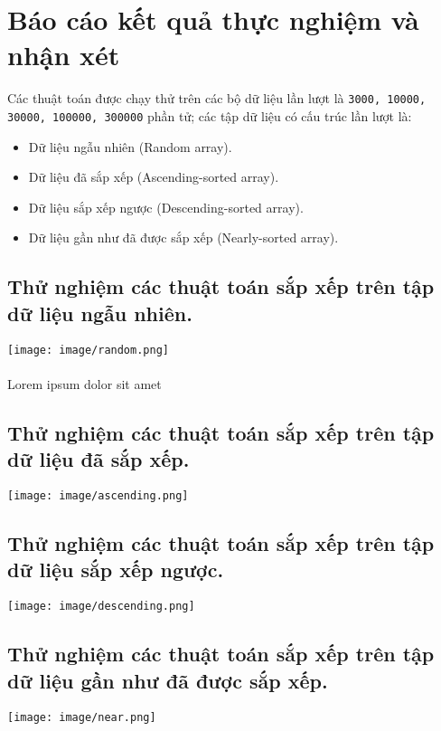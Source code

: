 \documentclass[]{article}
\begin{document}
\section{Báo cáo kết quả thực nghiệm và nhận xét}
Các thuật toán được chạy thử trên các bộ dữ liệu lần lượt là \texttt{3000, 10000, 30000, 100000, 300000} phần tử; các tập dữ liệu có cấu trúc lần lượt là:
\begin{itemize}
\item Dữ liệu ngẫu nhiên (Random array).
\item Dữ liệu đã sắp xếp (Ascending-sorted array).
\item Dữ liệu sắp xếp ngược (Descending-sorted array).
\item Dữ liệu gần như đã được sắp xếp (Nearly-sorted array).
\end{itemize}

\subsection{Thử nghiệm các thuật toán sắp xếp trên tập dữ liệu ngẫu nhiên.}
\texttt{[image: image/random.png]}
\\\\
Lorem ipsum dolor sit amet
\subsection{Thử nghiệm các thuật toán sắp xếp trên tập dữ liệu đã sắp xếp.}
\texttt{[image: image/ascending.png]}
\subsection{Thử nghiệm các thuật toán sắp xếp trên tập dữ liệu sắp xếp ngược.}
\texttt{[image: image/descending.png]}
\subsection{Thử nghiệm các thuật toán sắp xếp trên tập dữ liệu gần như đã được sắp xếp.}
\texttt{[image: image/near.png]}
\medskip

\begin{thebibliography}{10}

\end{thebibliography}
\end{document}

